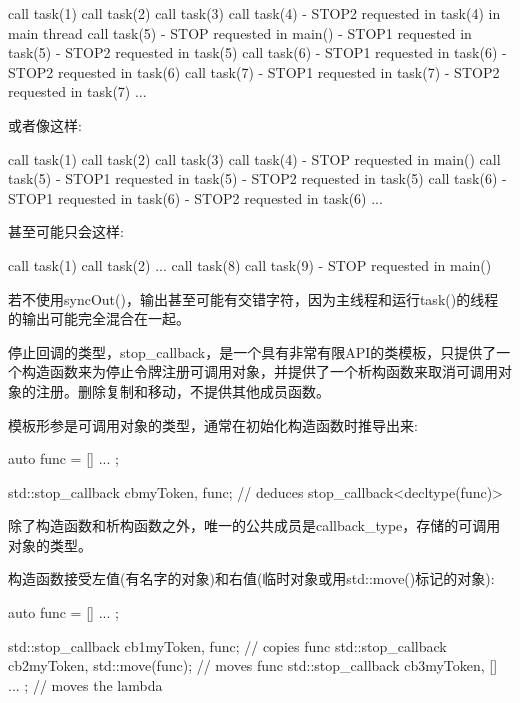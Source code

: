\begin{shell}
call task(1)
call task(2)
call task(3)
call task(4)
- STOP2 requested in task(4) in main thread
call task(5)
- STOP requested in main()
- STOP1 requested in task(5)
- STOP2 requested in task(5)
call task(6)
- STOP1 requested in task(6)
- STOP2 requested in task(6)
call task(7)
- STOP1 requested in task(7)
- STOP2 requested in task(7)
...
\end{shell}

或者像这样:

\begin{shell}
call task(1)
call task(2)
call task(3)
call task(4)
- STOP requested in main()
call task(5)
- STOP1 requested in task(5)
- STOP2 requested in task(5)
call task(6)
- STOP1 requested in task(6)
- STOP2 requested in task(6)
...
\end{shell}

甚至可能只会这样:

\begin{shell}
call task(1)
call task(2)
...
call task(8)
call task(9)
- STOP requested in main()
\end{shell}

若不使用syncOut()，输出甚至可能有交错字符，因为主线程和运行task()的线程的输出可能完全混合在一起。


停止回调的类型，stop\_callback，是一个具有非常有限API的类模板，只提供了一个构造函数来为停止令牌注册可调用对象，并提供了一个析构函数来取消可调用对象的注册。删除复制和移动，不提供其他成员函数。

模板形参是可调用对象的类型，通常在初始化构造函数时推导出来:

\begin{cpp}
auto func = [] { ... };

std::stop_callback cb{myToken, func}; // deduces stop_callback<decltype(func)>
\end{cpp}

除了构造函数和析构函数之外，唯一的公共成员是callback\_type，存储的可调用对象的类型。

构造函数接受左值(有名字的对象)和右值(临时对象或用std::move()标记的对象):

\begin{cpp}
auto func = [] { ... };

std::stop_callback cb1{myToken, func}; // copies func
std::stop_callback cb2{myToken, std::move(func)}; // moves func
std::stop_callback cb3{myToken, [] { ... }}; // moves the lambda
\end{cpp}

